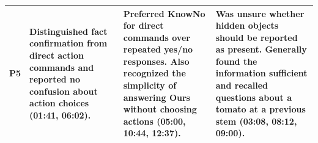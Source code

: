 \begin{table}[!htbp]
\begin{tabularx}{\textwidth}{@{}l>{\raggedright\arraybackslash}X>{\raggedright\arraybackslash}X>{\raggedright\arraybackslash}X@{}}
\addlinespace
P5 & Distinguished fact confirmation from direct action commands and reported no confusion about action choices (01:41, 06:02). & Preferred KnowNo for direct commands over repeated yes/no responses. Also recognized the simplicity of answering \textbf{Ours} without choosing actions (05:00, 10:44, 12:37). & Was unsure whether hidden objects should be reported as present. Generally found the information sufficient and recalled questions about a tomato at a previous stem (03:08, 08:12, 09:00). \\
\bottomrule
\end{tabularx}
\end{table}
